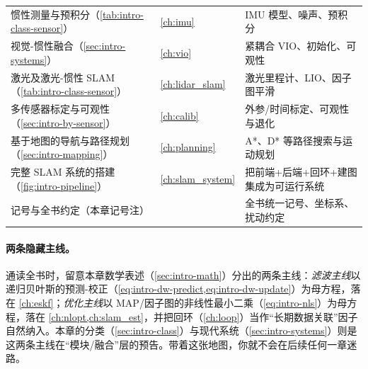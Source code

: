 \begin{table}[H]
\begin{tabular}{p{} p{} p{}}
惯性测量与预积分（\cref{tab:intro-class-sensor}） & \cref{ch:imu} & IMU 模型、噪声、预积分 \\
视觉-惯性融合（\cref{sec:intro-systems}） & \cref{ch:vio} & 紧耦合 VIO、初始化、可观性 \\
激光及激光-惯性 SLAM（\cref{tab:intro-class-sensor}） & \cref{ch:lidar_slam} & 激光里程计、LIO、因子图平滑 \\
多传感器标定与可观性（\cref{sec:intro-by-sensor}） & \cref{ch:calib} & 外参/时间标定、可观性与退化 \\
基于地图的导航与路径规划（\cref{sec:intro-mapping}） & \cref{ch:planning} & A*、D* 等路径搜索与运动规划 \\
完整 SLAM 系统的搭建（\cref{fig:intro-pipeline}） & \cref{ch:slam_system} & 把前端+后端+回环+建图集成为可运行系统 \\
记号与全书约定（本章记号注） & \nameref{ch:notation} & 全书统一记号、坐标系、扰动约定 \\
\bottomrule
\end{tabular}
\end{table}

\paragraph{两条隐藏主线。}
通读全书时，留意本章数学表述（\cref{sec:intro-math}）分出的两条主线：\emph{滤波主线}以递归贝叶斯的预测-校正（\cref{eq:intro-dw-predict,eq:intro-dw-update}）为母方程，落在 \cref{ch:eskf}；\emph{优化主线}以 MAP/因子图的非线性最小二乘（\cref{eq:intro-nls}）为母方程，落在 \cref{ch:nlopt,ch:slam_est}，并把回环（\cref{ch:loop}）当作“长期数据关联”因子自然纳入。本章的分类（\cref{sec:intro-class}）与现代系统（\cref{sec:intro-systems}）则是这两条主线在“模块/融合”层的预告。带着这张地图，你就不会在后续任何一章迷路。

